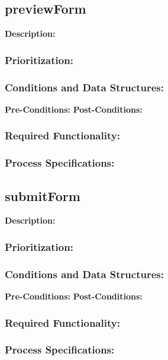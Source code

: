 \subsection{previewForm}
\textbf{Description:}

\subsubsection{Prioritization:}
\subsubsection{Conditions and Data Structures:}
\textbf{Pre-Conditions:}
\textbf{Post-Conditions:}	
\subsubsection{Required Functionality:} 
\subsubsection{Process Specifications:}


\subsection{submitForm}
\textbf{Description:}
\subsubsection{Prioritization:}
\subsubsection{Conditions and Data Structures:}
\textbf{Pre-Conditions:}
\textbf{Post-Conditions:}	
\subsubsection{Required Functionality:} 
\subsubsection{Process Specifications:}